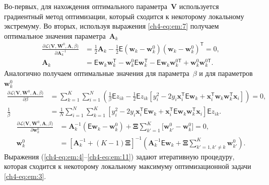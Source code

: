 Во-первых, для нахождения оптимального параметра~$\textbf{V}$ используется градиентный метод оптимизации, который сходится к некоторому локальному экстремуму.
Во вторых, используя выражения \eqref{ch4-eq:em:7} получаем оптимальное значения параметра~$\textbf{A}_{k}$
\[
\label{ch4-eq:em:9}
\begin{aligned}
\frac{\partial \mathcal{L}\bigr(\textbf{V}, \textbf{W}^{0}, \textbf{A}, \beta\bigr)}{\partial \textbf{A}^{-1}_k} &=  \frac{1}{2}\textbf{A}_{k} - \frac{1}{2}\mathsf{E}\left(\textbf{w}_{k} - \textbf{w}_{k}^{0}\right)\left(\textbf{w}_{k} - \textbf{w}_{k}^{0}\right)^{\mathsf{T}} = 0,\\
\textbf{A}_{k} &= \mathsf{E}\textbf{w}_{k}\textbf{w}_{k}^{\mathsf{T}} - \textbf{w}_{k}^{0}\mathsf{E}\textbf{w}_{k}^{\mathsf{T}} - \mathsf{E}\textbf{w}_{k}\textbf{w}_{k}^{0\mathsf{T}} + \textbf{w}_{k}^{0}\textbf{w}_{k}^{0\mathsf{T}}.
\end{aligned}
\]
Аналогично получаем оптимальные значения для параметра~$\beta$ и для параметров~$\textbf{w}_{k}^{0}$
\[
\label{ch4-eq:em:10}
\begin{aligned}
\frac{\partial \mathcal{L}\bigr(\textbf{V}, \textbf{W}^{0}, \textbf{A}, \beta\bigr)}{\partial \beta} &= \sum_{k=1}^{K}\sum_{i=1}^{N}\left(\frac{1}{\beta}\mathsf{E}z_{ik}-\frac{1}{2}\mathsf{E}z_{ik}\left[y_{i}^{2}-2y_{i}\textbf{x}_{i}^{\mathsf{T}}\mathsf{E}\textbf{w}_{k}+\textbf{x}_{i}^{\mathsf{T}}\textbf{w}_{k}\textbf{w}_{k}^{\mathsf{T}}\textbf{x}_{i}\right]\right) = 0,\\
\frac{1}{\beta}&=\frac{1}{N}\sum_{i=1}^{N}\sum_{k=1}^{K}\left[y_{i}^{2}-2y_{i}\textbf{x}_{i}^{\mathsf{T}}\mathsf{E}\textbf{w}_{k} + \textbf{x}_{i}^{\mathsf{T}}\mathsf{E}\textbf{w}_{k}\textbf{w}_{k}^{\mathsf{T}}\textbf{x}_{i}\right]\mathsf{E}z_{ik}.
\end{aligned}
\]
\[
\label{ch4-eq:em:11}
\begin{aligned}
\frac{\partial \mathcal{L}\bigr(\textbf{V}, \textbf{W}^{0}, \textbf{A}, \beta\bigr)}{\partial \mathbf{w}_k^0} &= \mathbf{A}_k^{-1}\left(\mathsf{E}\mathbf{w}_k - \mathbf{w}_{k}^{0}\right) + \bm{\Xi}\sum_{k'=1}^{K}\bigr[\mathbf{w}_{k'}^{0} -\mathbf{w}_{k}^{0}\bigr] = 0,\\
\textbf{w}_{k}^{0} &=\left[\textbf{A}_{k}^{-1}+\left(K-1\right)\bm{\Xi}\right]^{-1}\left(\textbf{A}^{-1}_{k}\mathsf{E}\textbf{w}_{k}+\bm{\Xi}\sum_{k'=1, k'\not=k}^{K}\textbf{w}_{k'}^{0}\right).
\end{aligned}
\]
Выражения (\ref{ch4-eq:em:4}--\ref{ch4-eq:em:11}) задают итеративную процедуру, которая сходится к некоторому локальному максимуму оптимизационной задачи \eqref{ch4-eq:em:3}.


